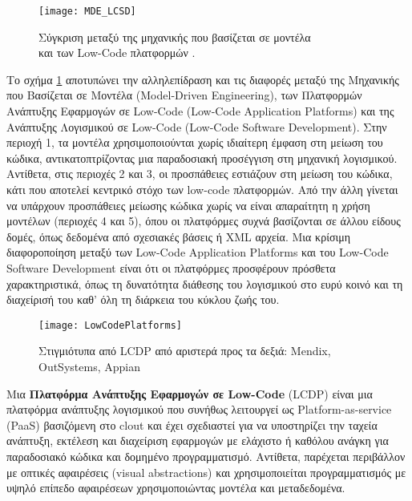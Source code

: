         \begin{figure}[h!] \noindent \centering
            \texttt{[image: MDE\_LCSD]}
            \caption{\centering Σύγκριση μεταξύ της μηχανικής που βασίζεται σε μοντέλα \\ και των Low-Code πλατφορμών \cite{MDELow}.}
            \label{fig:MDE_LCSD}
        \end{figure}

        Το σχήμα \ref{fig:MDE_LCSD} αποτυπώνει την αλληλεπίδραση και τις διαφορές μεταξύ της Μηχανικής που Βασίζεται σε Μοντέλα (Model-Driven Engineering), των Πλατφορμών Ανάπτυξης Εφαρμογών σε Low-Code (Low-Code Application Platforms) και της Ανάπτυξης Λογισμικού σε Low-Code (Low-Code Software Development). Στην περιοχή 1, τα μοντέλα χρησιμοποιούνται χωρίς ιδιαίτερη έμφαση στη μείωση του κώδικα, αντικατοπτρίζοντας μια παραδοσιακή προσέγγιση στη μηχανική λογισμικού.
        Αντίθετα, στις περιοχές 2 και 3, οι προσπάθειες εστιάζουν στη μείωση του κώδικα, κάτι που αποτελεί κεντρικό στόχο των low-code πλατφορμών. Από την άλλη γίνεται να υπάρχουν προσπάθειες μείωσης κώδικα χωρίς να είναι απαραίτητη η χρήση μοντέλων (περιοχές 4 και 5), όπου οι πλατφόρμες συχνά βασίζονται σε άλλου είδους δομές, όπως δεδομένα από σχεσιακές βάσεις ή XML αρχεία. Μια κρίσιμη διαφοροποίηση μεταξύ των Low-Code Application Platforms και του Low-Code Software Development είναι ότι οι πλατφόρμες προσφέρουν πρόσθετα χαρακτηριστικά, όπως τη δυνατότητα διάθεσης του λογισμικού στο ευρύ κοινό και τη διαχείρισή του καθ' όλη τη διάρκεια του κύκλου ζωής του.

        \begin{figure}[h!] \noindent \centering
            \texttt{[image: LowCodePlatforms]}
            \caption{Στιγμιότυπα από LCDP από αριστερά προς τα δεξιά: Mendix, OutSystems, Appian \cite{LowCodeMendix}}
            \label{fig:LowCodePlatforms}
        \end{figure}

        Μια \textbf{Πλατφόρμα Ανάπτυξης Εφαρμογών σε Low-Code} (LCDP) είναι μια πλατφόρμα ανάπτυξης λογισμικού που συνήθως λειτουργεί ως Platform-as-service (PaaS) βασιζόμενη στο clout και έχει σχεδιαστεί για να υποστηρίζει την ταχεία ανάπτυξη, εκτέλεση και διαχείριση εφαρμογών με ελάχιστο ή καθόλου ανάγκη για παραδοσιακό κώδικα και δομημένο προγραμματισμό. Αντίθετα, παρέχεται περιβάλλον με οπτικές αφαιρέσεις (visual abstractions) και χρησιμοποιείται προγραμματισμός με υψηλό επίπεδο αφαιρέσεων χρησιμοποιώντας μοντέλα και μεταδεδομένα.


